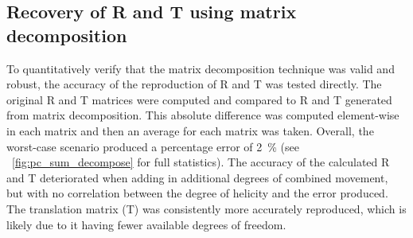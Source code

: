 \documentclass[times, twoside, watermark]{zHenriquesLab-StyleBioRxiv}
\begin{document}
\subsection{Recovery of R and T using matrix decomposition}

To quantitatively verify that the matrix decomposition technique was valid and robust, the accuracy of the reproduction of \gls{R} and \gls{T} was tested directly.
The original \gls{R} and \gls{T} matrices were computed and compared to \gls{R} and \gls{T} generated from matrix decomposition. This absolute difference was computed element-wise in each matrix and then an average for each matrix was taken.
Overall, the worst-case scenario produced a percentage error of \SI{2}{\percent} (see \figurename~\ref{fig:pc_sum_decompose} for full statistics).
The accuracy of the calculated \gls{R} and \gls{T} deteriorated when adding in additional degrees of combined movement, but with no correlation between the degree of helicity and the error produced.
The translation matrix (\gls{T}) was consistently more accurately reproduced, which is likely due to it having fewer available degrees of freedom.


\end{document}

